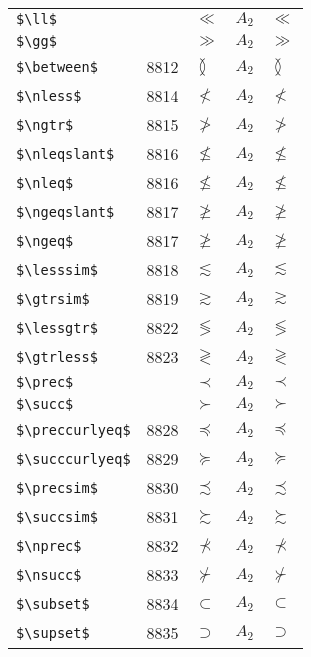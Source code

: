 \documentclass{article}
\begin{document}
\begin{table}
\begin{center}
\begin{tabular}{llll}
 \verb#$\ll$#          &         & $\ll$          & $A_2\quad \ll$\\
 \verb#$\gg$#          &         & $\gg$          & $A_2\quad \gg$\\
 \verb#$\between$#     & 8812    & $\between$     & $A_2\quad \between$\\
 \verb#$\nless$#       & 8814    & $\nless$       & $A_2\quad \nless$\\
 \verb#$\ngtr$#        & 8815    & $\ngtr$        & $A_2\quad \ngtr$\\
 \verb#$\nleqslant$#   & 8816    & $\nleqslant$   & $A_2\quad \nleqslant$\\
 \verb#$\nleq$#        & 8816    & $\nleq$        & $A_2\quad \nleq$\\
 \verb#$\ngeqslant$#   & 8817    & $\ngeqslant$   & $A_2\quad \ngeqslant$\\
 \verb#$\ngeq$#        & 8817    & $\ngeq$        & $A_2\quad \ngeq$\\
 \verb#$\lesssim$#     & 8818    & $\lesssim$     & $A_2\quad \lesssim$\\
 \verb#$\gtrsim$#      & 8819    & $\gtrsim$      & $A_2\quad \gtrsim$\\
 \verb#$\lessgtr$#     & 8822    & $\lessgtr$     & $A_2\quad \lessgtr$\\
 \verb#$\gtrless$#     & 8823    & $\gtrless$     & $A_2\quad \gtrless$\\
 \verb#$\prec$#        &         & $\prec$        & $A_2\quad \prec$\\
 \verb#$\succ$#        &         & $\succ$        & $A_2\quad \succ$\\
 \verb#$\preccurlyeq$# & 8828    & $\preccurlyeq$ & $A_2\quad \preccurlyeq$\\
 \verb#$\succcurlyeq$# & 8829    & $\succcurlyeq$ & $A_2\quad \succcurlyeq$\\
 \verb#$\precsim$#     & 8830    & $\precsim$     & $A_2\quad \precsim$\\
 \verb#$\succsim$#     & 8831    & $\succsim$     & $A_2\quad \succsim$\\
 \verb#$\nprec$#       & 8832    & $\nprec$       & $A_2\quad \nprec$\\
 \verb#$\nsucc$#       & 8833    & $\nsucc$       & $A_2\quad \nsucc$\\
 \verb#$\subset$#      & 8834    & $\subset$      & $A_2\quad \subset$\\
 \verb#$\supset$#      & 8835    & $\supset$      & $A_2\quad \supset$\\

\end{tabular}
\end{center}
\end{table}
\end{document}
